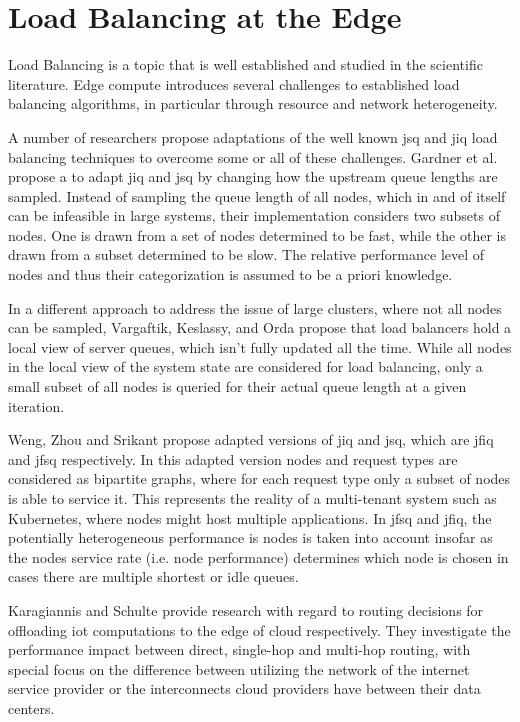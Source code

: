\section{Load Balancing at the Edge}
Load Balancing is a topic that is well established and studied in the scientific literature.
Edge compute introduces several challenges to established load balancing algorithms, in particular through resource and network heterogeneity\cite{gardnerScalableLoadBalancing2021}.

A number of researchers propose adaptations of the well known \gls{jsq} and \gls{jiq} load balancing techniques to overcome some or all of these challenges\cite{gardnerScalableLoadBalancing2021}\cite{wengOptimalLoadBalancing2020}\cite{vargaftikLSQLoadBalancing2020}.
Gardner et al. propose a to adapt \gls{jiq} and \gls{jsq} by changing how the upstream queue lengths are sampled.
Instead of sampling the queue length of all nodes, which in and of itself can be infeasible in large systems\cite{gardnerScalableLoadBalancing2021}, their implementation considers two subsets of nodes.
One is drawn from a set of nodes determined to be fast, while the other is drawn from a subset determined to be slow.
The relative performance level of nodes and thus their categorization is assumed to be a priori knowledge.

In a different approach to address the issue of large clusters, where not all nodes can be sampled, Vargaftik, Keslassy, and Orda propose that load balancers hold a local view of server queues, which isn't fully updated all the time\cite{vargaftikLSQLoadBalancing2020}.
While all nodes in the local view of the system state are considered for load balancing, only a small subset of all nodes is queried for their actual queue length at a given iteration.

Weng, Zhou and Srikant propose adapted versions of \gls{jiq} and \gls{jsq}, which are \gls{jfiq} and \gls{jfsq} respectively.
In this adapted version nodes and request types are considered as bipartite graphs, where for each request type only a subset of nodes is able to service it.
This represents the reality of a multi-tenant system such as Kubernetes\cite{kubernetes}, where nodes might host multiple applications.
In \gls{jfsq} and \gls{jfiq}, the potentially heterogeneous performance is nodes is taken into account insofar as the nodes service rate (i.e. node performance) determines which node is chosen in cases there are multiple shortest or idle queues.


Karagiannis and Schulte provide research with regard to routing decisions for offloading \gls{iot} computations to the edge of cloud respectively\cite{karagiannisEdgeRoutingUsingCompute2021}.
They investigate the performance impact between direct, single-hop and multi-hop routing, with special focus on the difference between utilizing the network of the internet service provider or the interconnects cloud providers have between their data centers.

